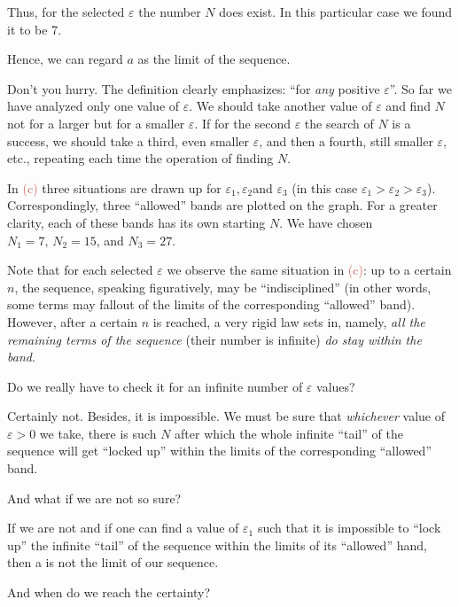 {Thus, for the selected $\varepsilon$ the number $N$ does exist. In this particular case we found it to be 7.


\rdr Hence, we can regard $a$ as the limit of the sequence.

\athr Don't you hurry. The definition clearly emphasizes: ``for \emph{any} positive $\varepsilon$''. So far we have analyzed only one value of $\varepsilon$. We should take another value of $\varepsilon$ and find $N$ not for a larger but for a smaller $\varepsilon$. If for the second $\varepsilon$ the search of $N$ is a success, we should take a third, even smaller $\varepsilon$, and then a fourth, still smaller $\varepsilon$, etc., repeating each time the operation of finding $N$.

In   \textcolor{IndianRed}{(c)} three situations are drawn up for  $\varepsilon_{1}, \varepsilon_{2}$and $\varepsilon_{3}$ (in this case $\varepsilon_{1} > \varepsilon_{2} > \varepsilon_{3}$). Correspondingly, three ``allowed'' bands are plotted on the graph. For a greater clarity, each of these bands has its own starting $N$. We have chosen $N_{1}=7, \, N_{2} =15$, and $N_{3}=27$. 

Note that for each selected $\varepsilon$ we observe the same situation in  \textcolor{IndianRed}{(c)}: up to a certain $n$, the sequence, speaking figuratively, may be ``indisciplined'' (in other words, some terms may fallout of the limits of the corresponding ``allowed'' band). However, after a certain $n$ is reached, a very rigid law sets in, namely, \emph{all the remaining terms of the sequence} (their number is infinite) \emph{do stay within the band}.

\rdr Do we really have to check it for an infinite number of $\varepsilon$ values?

\athr Certainly not. Besides, it is impossible. We must be sure that \emph{whichever} value of $\varepsilon > 0$ we take, there is such $N$ after which the whole infinite ``tail'' of the sequence will get ``locked up'' within the limits of the corresponding ``allowed'' band.

\rdr And what if we are not so sure?

\athr If we are not and if one can find a value of $\varepsilon_{1}$ such that it is impossible to ``lock up'' the infinite ``tail'' of the sequence within the limits of its ``allowed'' hand, then a is not the limit of our sequence.

\rdr And when do we reach the certainty?

}
